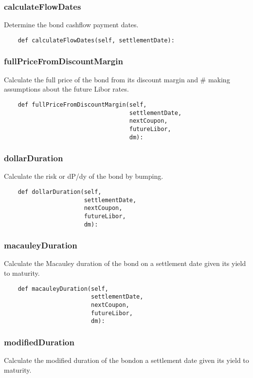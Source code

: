 \documentclass[twoside,11pt]{book}
\begin{document}
\subsubsection*{{\bf calculateFlowDates}}
Determine the bond cashflow payment dates.  

\begin{lstlisting}
    def calculateFlowDates(self, settlementDate):
\end{lstlisting}

\subsubsection*{{\bf fullPriceFromDiscountMargin}}
Calculate the full price of the bond from its discount margin and \# making assumptions about the future Libor rates.  

\begin{lstlisting}
    def fullPriceFromDiscountMargin(self,
                                    settlementDate,
                                    nextCoupon,
                                    futureLibor,
                                    dm):
\end{lstlisting}

\subsubsection*{{\bf dollarDuration}}
Calculate the risk or dP/dy of the bond by bumping.  

\begin{lstlisting}
    def dollarDuration(self,
                       settlementDate,
                       nextCoupon,
                       futureLibor,
                       dm):
\end{lstlisting}

\subsubsection*{{\bf macauleyDuration}}
Calculate the Macauley duration of the bond on a settlement date given its yield to maturity.  

\begin{lstlisting}
    def macauleyDuration(self,
                         settlementDate,
                         nextCoupon,
                         futureLibor,
                         dm):
\end{lstlisting}

\subsubsection*{{\bf modifiedDuration}}
Calculate the modified duration of the bondon a settlement date given its yield to maturity.  
\end{document}
